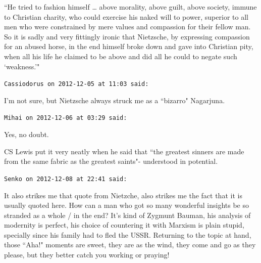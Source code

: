 \begin{footnotesize}
\begin{sffamily}
``He tried to fashion himself … above morality, above guilt, above society, immune to Christian charity, who could exercise his naked will to power, superior to all men who were constrained by mere values and compassion for their fellow man. So it is sadly and very fittingly ironic that Nietzsche, by expressing compassion for an abused horse, in the end himself broke down and gave into Christian pity, when all his life he claimed to be above and did all he could to negate such `weakness.'"


\hfill

\texttt{Cassiodorus on 2012-12-05 at 11:03 said: }

I'm not sure, but Nietzsche always struck me as a ``bizarro" Nagarjuna.


\hfill

\texttt{Mihai on 2012-12-06 at 03:29 said: }

Yes, no doubt.

CS Lewis put it very neatly when he said that ``the greatest sinners are made from the same fabric as the greatest saints"- understood in potential.


\hfill

\texttt{Senko on 2012-12-08 at 22:41 said: }

It also strikes me that quote from Nietzche, also strikes me the fact that it is usually quoted here. How can a man who got so many wonderful insights be so stranded as a whole / in the end? It's kind of Zygmunt Bauman, his analysis of modernity is perfect, his choice of countering it with Marxism is plain stupid, specially since his family had to fled the USSR. Returning to the topic at hand, those ``Aha!" moments are sweet, they are as the wind, they come and go as they please, but they better catch you working or praying!


\hfill


\end{sffamily}\end{footnotesize}
